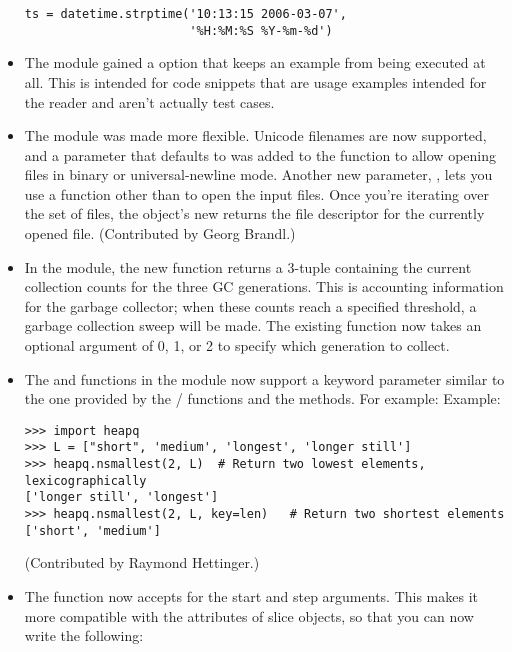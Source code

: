 \documentclass{howto}
\begin{document}
\begin{itemize}
\begin{verbatim}
ts = datetime.strptime('10:13:15 2006-03-07',
                       '%H:%M:%S %Y-%m-%d')
\end{verbatim}

\item The  module gained a  option that
keeps an example from being executed at all.  This is intended for
code snippets that are usage examples intended for the reader and
aren't actually test cases.

\item The  module was made more flexible.
Unicode filenames are now supported, and a  parameter that
defaults to  was added to the
 function to allow opening files in binary or
universal-newline mode.  Another new parameter, ,
lets you use a function other than  
to open the input files.  Once you're iterating over 
the set of files, the  object's new
 returns the file descriptor for the currently opened file.
(Contributed by Georg Brandl.)

\item In the  module, the new  function
returns a 3-tuple containing the current collection counts for the
three GC generations.  This is accounting information for the garbage
collector; when these counts reach a specified threshold, a garbage
collection sweep will be made.  The existing 
function now takes an optional  argument of 0, 1, or 2
to specify which generation to collect.

\item The  and 
 functions in the  module 
now support a  keyword parameter similar to the one
provided by the / functions
and the  methods.  For example:
Example:

\begin{verbatim}
>>> import heapq
>>> L = ["short", 'medium', 'longest', 'longer still']
>>> heapq.nsmallest(2, L)  # Return two lowest elements, lexicographically
['longer still', 'longest']
>>> heapq.nsmallest(2, L, key=len)   # Return two shortest elements
['short', 'medium']
\end{verbatim}

(Contributed by Raymond Hettinger.)

\item The  function now accepts
 for the start and step arguments.  This makes it more
compatible with the attributes of slice objects, so that you can now write
the following:


\end{itemize}
\end{document}
